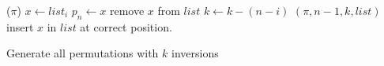 \begin{algorithm}[t]
    \begin{algorithmic}[1]
                ($\pi$)
            \Else
                    \State $x \gets list_{i}$
                        \State $p_{n} \gets x$
                        \State remove $x$ from $list$ 
                        \State $k \gets k - (n-i)$
                        $(\pi, n-1, k, list)$
                        \State insert $x$ in $list$ at correct position.
                    \EndIf
                \EndFor
            \EndIf
        \EndFunction
        
    \end{algorithmic}
    \caption{Generate all permutations with $k$ inversions}
    \label{Alg:KInv}
\end{algorithm} 

